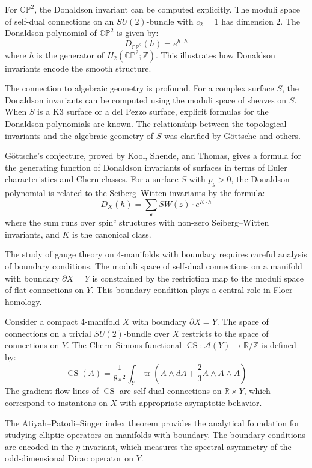 For $\mathbb{CP}^2$, the Donaldson invariant can be computed explicitly. The moduli space of self-dual connections on an $SU(2)$-bundle with $c_2 = 1$ has dimension 2. The Donaldson polynomial of $\mathbb{CP}^2$ is given by:
\[
D_{\mathbb{CP}^2}(h) = e^{h \cdot h}
\]
where $h$ is the generator of $H_2(\mathbb{CP}^2;\mathbb{Z})$. This illustrates how Donaldson invariants encode the smooth structure.

The connection to algebraic geometry is profound. For a complex surface $S$, the Donaldson invariants can be computed using the moduli space of sheaves on $S$. When $S$ is a K3 surface or a del Pezzo surface, explicit formulas for the Donaldson polynomials are known. The relationship between the topological invariants and the algebraic geometry of $S$ was clarified by Göttsche and others.

Göttsche's conjecture, proved by Kool, Shende, and Thomas, gives a formula for the generating function of Donaldson invariants of surfaces in terms of Euler characteristics and Chern classes. For a surface $S$ with $p_g > 0$, the Donaldson polynomial is related to the Seiberg--Witten invariants by the formula:
\[
D_X(h) = \sum_{\mathfrak{s}} SW(\mathfrak{s}) \cdot e^{K \cdot h}
\]
where the sum runs over spin$^c$ structures with non-zero Seiberg--Witten invariants, and $K$ is the canonical class.

The study of gauge theory on 4-manifolds with boundary requires careful analysis of boundary conditions. The moduli space of self-dual connections on a manifold with boundary $\partial X = Y$ is constrained by the restriction map to the moduli space of flat connections on $Y$. This boundary condition plays a central role in Floer homology.

Consider a compact 4-manifold $X$ with boundary $\partial X = Y$. The space of connections on a trivial $SU(2)$-bundle over $X$ restricts to the space of connections on $Y$. The Chern--Simons functional $\operatorname{CS}: \mathcal{A}(Y) \to \mathbb{R}/\mathbb{Z}$ is defined by:
\[
\operatorname{CS}(A) = \frac{1}{8\pi^2} \int_Y \operatorname{tr}\left(A \wedge dA + \frac{2}{3} A \wedge A \wedge A\right)
\]
The gradient flow lines of $\operatorname{CS}$ are self-dual connections on $\mathbb{R} \times Y$, which correspond to instantons on $X$ with appropriate asymptotic behavior.

The Atiyah--Patodi--Singer index theorem provides the analytical foundation for studying elliptic operators on manifolds with boundary. The boundary conditions are encoded in the $\eta$-invariant, which measures the spectral asymmetry of the odd-dimensional Dirac operator on $Y$.

